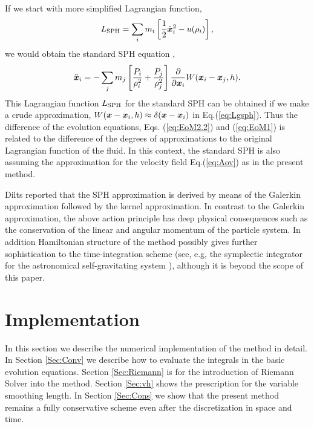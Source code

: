 \documentclass{cjour}
\newcommand{ \Vec   }[1]{ \mbox{\boldmath $ #1 $} }
\newcommand{ \PD    }[2]{ \frac{ \partial #1 }{ \partial #2 } }
\begin{document}
\begin{article}
%
If we start with more simplified Lagrangian function, 
\begin{equation}
                L_{\rm SPH} = 
                \sum_i m_i \left[ \frac{1}{2} \dot{\Vec{x}}_i ^2 
                                  - u(\rho_i) 
                           \right] , 
                                                  \label{eq:Lsph}
\end{equation}
we would obtain the standard SPH equation \cite{GM:1982},
\begin{equation}
                \ddot{\Vec{x}}_i = 
              - \sum_{j} m_j \left[   
                                    \frac{ P_i }{ \rho_i^2 }
                                  + \frac{ P_j }{ \rho_j^2 } 
                             \right]
                \PD{}{\Vec{x}_i} W(\Vec{x}_i-\Vec{x}_j, h).
                                                        \label{eq:EoM1}
\end{equation}
%
This Lagrangian function $L_{\rm SPH}$ for the standard SPH can be 
obtained if we make a crude approximation, 
$W(\Vec{x}-\Vec{x}_i,h) \approx \delta(\Vec{x}-\Vec{x}_i)$ 
in Eq.(\ref{eq:Lgsph}).  
Thus the difference of the evolution equations, 
Eqs. (\ref{eq:EoM2.2}) and (\ref{eq:EoM1}) is related to the difference 
of the degrees of approximations 
to the original Lagrangian function of the fluid.  
In this context, the standard SPH is also assuming the approximation 
for the velocity field Eq.(\ref{eq:Aov}) as in the present method.  

Dilts \cite{Dilts:1999} reported that the SPH approximation is derived 
by means of the Galerkin approximation followed by 
the kernel approximation. 
In contrast to the Galerkin approximation, the above action principle 
has deep physical consequences such as the conservation of the linear 
and angular momentum of the particle system.   
In addition Hamiltonian structure of the method possibly gives further 
sophistication to the time-integration scheme   
(see, e.g, the symplectic integrator for the astronomical 
self-gravitating system \cite{WisdomHolman:1992}), 
although it is beyond the scope of this paper.  

 

\section{Implementation}
                                                   \label{Sec:Imp}
In this section we describe the numerical implementation of 
the method in detail. 
In Section \ref{Sec:Conv} 
we describe how to evaluate the integrals 
in the basic evolution equations. 
Section \ref{Sec:Riemann} 
is for the introduction of Riemann Solver into the method.  
Section \ref{Sec:vh} 
shows the prescription for the variable smoothing length. 
In Section \ref{Sec:Cons} we show that the present method remains 
a fully conservative scheme even after the discretization in 
space and time. 


\end{article}
\end{document}
